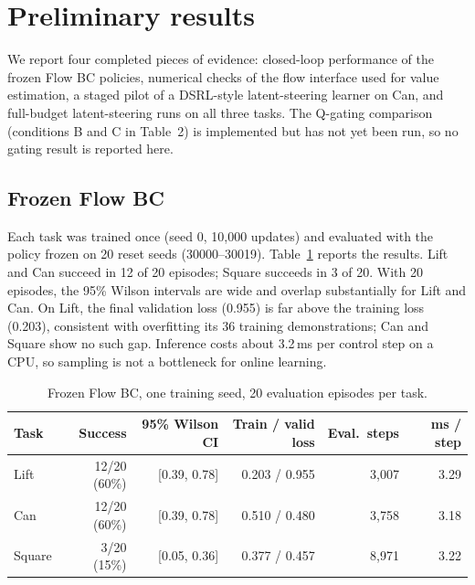 \section{Preliminary results}

We report four completed pieces of evidence: closed-loop performance of the
frozen Flow BC policies, numerical checks of the flow interface used for value
estimation, a staged pilot of a DSRL-style latent-steering learner on Can, and
full-budget latent-steering runs on all three tasks.
The Q-gating comparison (conditions B and C in Table~2) is implemented but has
not yet been run, so no gating result is reported here.

\subsection{Frozen Flow BC}

Each task was trained once (seed 0, 10{,}000 updates) and evaluated with the
policy frozen on 20 reset seeds (30000--30019). Table~\ref{tab:bc} reports the
results. Lift and Can succeed in 12 of 20 episodes; Square succeeds in 3 of 20.
With 20 episodes, the 95\% Wilson intervals are wide and overlap substantially
for Lift and Can. On Lift, the final validation loss (0.955) is far above the
training loss (0.203), consistent with overfitting its 36 training
demonstrations; Can and Square show no such gap. Inference costs about 3.2\,ms
per control step on a CPU, so sampling is not a bottleneck for online
learning.

\begin{table}[t]
  \centering
  \small
  \caption{Frozen Flow BC, one training seed, 20 evaluation episodes per task.}
  \label{tab:bc}
  \begin{tabular}{lrrrrr}
    \toprule
    Task & Success & 95\% Wilson CI & Train / valid loss & Eval.\ steps & ms / step \\
    \midrule
    Lift   & 12/20 (60\%) & [0.39, 0.78] & 0.203 / 0.955 & 3{,}007 & 3.29 \\
    Can    & 12/20 (60\%) & [0.39, 0.78] & 0.510 / 0.480 & 3{,}758 & 3.18 \\
    Square &  3/20 (15\%) & [0.05, 0.36] & 0.377 / 0.457 & 8{,}971 & 3.22 \\
    \bottomrule
  \end{tabular}
\end{table}


